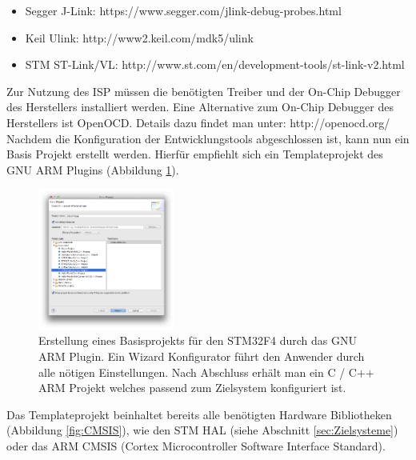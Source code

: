 \begin{itemize}
	\item Segger J-Link:
	\newline
	https://www.segger.com/jlink-debug-probes.html
	\item Keil Ulink: 
	\newline
	http://www2.keil.com/mdk5/ulink
	\item STM ST-Link/VL: 
	\newline
	http://www.st.com/en/development-tools/st-link-v2.html
\end{itemize}
Zur Nutzung des ISP müssen die benötigten Treiber und der On-Chip Debugger des Herstellers installiert werden. Eine Alternative zum On-Chip Debugger des Herstellers ist OpenOCD. Details dazu findet man unter:
\newline
\newline
http://openocd.org/
\newline
\newline            
Nachdem die Konfiguration der Entwicklungstools abgeschlossen ist, kann nun ein Basis Projekt erstellt werden. Hierfür empfiehlt sich ein Templateprojekt des GNU ARM Plugins (Abbildung \ref{fig:NewProj}).
\begin{figure}[htb]
	\centering
		\includegraphics[width=0.4\textwidth]{Pictures/Einrichtung/NewF4Project.png}
	\caption{Erstellung eines Basisprojekts für den STM32F4 durch das GNU ARM Plugin. Ein Wizard Konfigurator führt den Anwender durch alle nötigen Einstellungen. Nach Abschluss erhält man ein C / C++ ARM Projekt welches passend zum Zielsystem konfiguriert ist.}
	\label{fig:NewProj}
\end{figure}
Das Templateprojekt beinhaltet bereits alle benötigten Hardware Bibliotheken (Abbildung \ref{fig:CMSIS}), wie den STM HAL (siehe Abschnitt \ref{sec:Zielsysteme}) oder das ARM CMSIS (Cortex Microcontroller Software Interface Standard).
